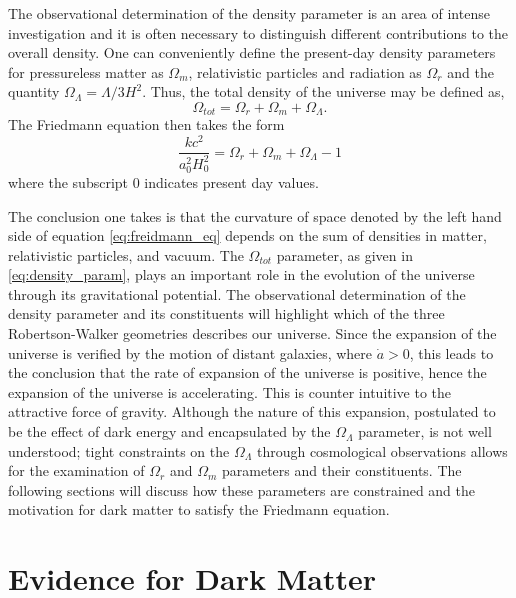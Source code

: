 The observational determination of the density parameter is an area of intense investigation and it is often necessary to distinguish different contributions to the overall density. One can conveniently define the present-day density parameters for pressureless matter as $\Omega_{m}$, relativistic particles and radiation as $\Omega_r$ and the quantity $\Omega_{\Lambda} = \Lambda/3H^2$. Thus, the total density of the universe may be defined as, 
%
\begin{equation}
  \Omega_{tot} = \Omega_{r} + \Omega_{m} + \Omega_{\Lambda}. 
\end{equation}
%
The Friedmann equation then takes the form
%
\begin{equation}\label{eq:freidmann_eq}
  \frac{kc^2}{a_{0}^2H_{0}^2} = \Omega_{r} + \Omega_{m} + \Omega_{\Lambda} - 1
\end{equation}
%
where the subscript 0 indicates present day values. 

The conclusion one takes is that the curvature of space denoted by the left hand side of equation \ref{eq:freidmann_eq} depends on the sum of densities in matter, relativistic particles, and vacuum.  The $\Omega_{tot}$ parameter, as given in \ref{eq:density_param}, plays an important role in the evolution of the universe through its gravitational potential. The observational determination of the density parameter and its constituents will highlight which of the three Robertson-Walker geometries describes our universe. Since the expansion of the universe is verified by the motion of distant galaxies, where $\dot{a} > 0$, this leads to the conclusion that the rate of expansion of the universe is positive, hence the expansion of the universe is accelerating. This is counter intuitive to the attractive force of gravity. Although the nature of this expansion, postulated to be the effect of dark energy and encapsulated by the $\Omega_{\Lambda}$ parameter, is not well understood; tight constraints on the $\Omega_{\Lambda}$ through cosmological observations allows for the examination of $\Omega_{r}$ and $\Omega_{m}$ parameters and their constituents. The following sections will discuss how these parameters are constrained and the motivation for dark matter to satisfy the Friedmann equation.


\section{Evidence for Dark Matter}
\label{sec:darkmatter}

